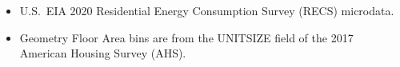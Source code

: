\begin{itemize}
\item U.S.~EIA 2020 Residential Energy Consumption Survey (RECS) microdata.
\item Geometry Floor Area bins are from the UNITSIZE field of the 2017 American Housing Survey (AHS).
\end{itemize}
